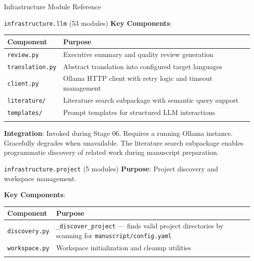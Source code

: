 \documentclass[
  ignorenonframetext,
]{beamer}
\newcounter{none} %
\begin{document}
\begin{frame}[fragile]{Infrastructure Module Reference}
\begin{block}{\texttt{infrastructure.llm} (53 modules)}
\textbf{Key Components}:

{\def\LTcaptype{none} %
\begin{longtable}[]{@{}
  >{\raggedright\arraybackslash}p{}
  >{\raggedright\arraybackslash}p{}@{}}
\toprule\noalign{}
\begin{minipage}[b]{\linewidth}\raggedright
Component
\end{minipage} & \begin{minipage}[b]{\linewidth}\raggedright
Purpose
\end{minipage} \\
\midrule\noalign{}
\endhead
\texttt{review.py} & Executive summary and quality review generation \\
\texttt{translation.py} & Abstract translation into configured target
languages \\
\texttt{client.py} & Ollama HTTP client with retry logic and timeout
management \\
\texttt{literature/} & Literature search subpackage with semantic query
support \\
\texttt{templates/} & Prompt templates for structured LLM
interactions \\
\bottomrule\noalign{}
\end{longtable}
}

\textbf{Integration}: Invoked during Stage 06. Requires a running Ollama
instance. Gracefully degrades when unavailable. The literature search
subpackage enables programmatic discovery of related work during
manuscript preparation.
\end{block}

\begin{block}{\texttt{infrastructure.project} (5 modules)}
\protect{}\label{infrastructure.project-5-modules}
\textbf{Purpose}: Project discovery and workspace management.

\textbf{Key Components}:

{\def\LTcaptype{none} %
\begin{longtable}[]{@{}
  >{\raggedright\arraybackslash}p{}
  >{\raggedright\arraybackslash}p{}@{}}
\toprule\noalign{}
\begin{minipage}[b]{\linewidth}\raggedright
Component
\end{minipage} & \begin{minipage}[b]{\linewidth}\raggedright
Purpose
\end{minipage} \\
\midrule\noalign{}
\endhead
\texttt{discovery.py} & \texttt{\_discover\_project} --- finds valid
project directories by scanning for \texttt{manuscript/config.yaml} \\
\texttt{workspace.py} & Workspace initialization and cleanup
utilities \\
\bottomrule\noalign{}
\end{longtable}
}


\end{block}
\end{frame}
\end{document}

